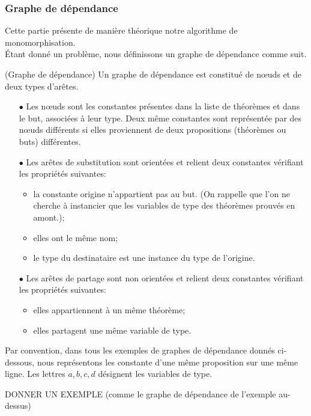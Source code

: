 \subsubsection{Graphe de dépendance}
Cette partie présente de manière théorique notre algorithme de
monomorphisation.\\

Étant donné un problème, nous définissons un graphe de dépendance comme suit.
\begin{mydef} (Graphe de dépendance)
Un graphe de dépendance est constitué de nœuds et de deux types
d'arêtes.
\begin{enumerate}
\item[$\bullet$] Les nœuds sont les constantes présentes dans la liste
  de théorèmes et dans le but, associées à leur type. Deux m\^eme
  constantes sont représentée par des nœuds différents si elles
  proviennent de deux propositions (théorèmes ou buts) différentes.
\item[$\bullet$] Les arêtes de {\color{blue}substitution} sont orientées
  et relient deux
  constantes vérifiant les propriétés suivantes:
  \begin{itemize}
  \item la constante origine n'appartient pas au but. (On rappelle que
    l'on ne cherche à instancier que les variables de type des théorèmes
    prouvés en amont.);
  \item elles ont le m\^eme nom;
  \item le type du destinataire est une instance du type de l'origine.
  \end{itemize}
\item[$\bullet$] Les ar\^etes de {\color{green}partage} sont non
  orientées et relient deux constantes
  vérifiant les propriétés suivantes:
  \begin{itemize}
  \item elles appartiennent à un m\^eme théorème;
  \item elles partagent une m\^eme variable de type.
  \end{itemize}
\end{enumerate}
\end{mydef}

Par convention, dans tous les exemples de graphes de dépendance donnés
ci-dessous, nous représentons les constante d'une même proposition sur
une même ligne. Les lettres $a,b,c,d$ désignent les variables de type.

\todo DONNER UN EXEMPLE (comme le graphe de dépendance de l'exemple
au-dessus)

